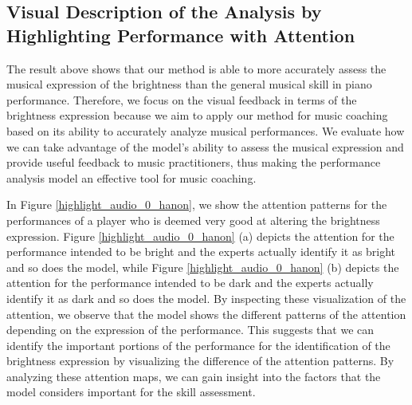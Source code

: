 \subsection{Visual Description of the Analysis by Highlighting Performance with Attention} \label{visualization_audio}
The result above shows that our method is able to more accurately assess the musical expression of the brightness than the general musical skill in piano performance.
Therefore, we focus on the visual feedback in terms of the brightness expression because we aim to apply our method for music coaching based on its ability to accurately analyze musical performances.
We evaluate how we can take advantage of the model's ability to assess the musical expression and 
provide useful feedback to music practitioners, thus making the performance analysis model an effective tool for music coaching.

In Figure \ref{highlight_audio_0_hanon}, we show the attention patterns for the performances of a player who is deemed very good at altering the brightness expression.
Figure \ref{highlight_audio_0_hanon} (a) depicts the attention for the performance intended to be bright and the experts actually identify it as bright and so does the model, while Figure \ref{highlight_audio_0_hanon} (b) depicts the attention for the performance intended to be dark and the experts actually identify it as dark and so does the model.
By inspecting these visualization of the attention, we observe that the model shows the different patterns of the attention depending on the expression of the performance.
This suggests that we can identify the important portions of the performance for the identification of the brightness expression by visualizing the difference of the attention patterns.
By analyzing these attention maps, we can gain insight into the factors that the model considers important for the skill assessment.

